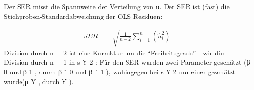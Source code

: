 Der SER misst die Spannweite der Verteilung von u. Der SER ist (fast) die
Stichproben-Standardabweichung der OLS Residuen:

\begin{align*}
SER&=\sqrt{\frac{1}{n-2}\sum^{n}_{i=1} ( \hat u_i^2 )}

\end{align*}
Division durch n − 2 ist eine Korrektur um die “Freiheitsgrade” - wie die
Division durch n − 1 in s Y 2 : Für den SER wurden zwei Parameter
geschätzt (β 0 und β 1 , durch β ˆ 0 und β ˆ 1 ), wohingegen bei s Y 2 nur einer
geschätzt wurde(μ Y , durch Y ).
